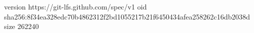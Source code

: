 version https://git-lfs.github.com/spec/v1
oid sha256:8f34ea328edc70b4862312f2bd1055217b21f6450434afea258262c16db2038d
size 262240
